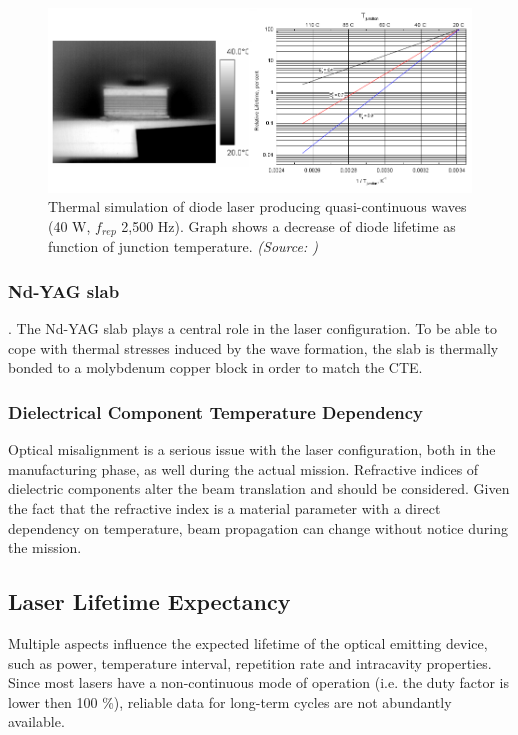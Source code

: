\begin{figure}[ht!]
\centering
\includegraphics[scale=0.5]{chapters/img/diode_thermal.png} 
\caption{Thermal simulation of diode laser producing quasi-continuous waves (40 W, $f_{rep}$ 2,500 Hz). Graph shows a decrease of diode lifetime as function of junction temperature. \emph{(Source: \cite{thermaldiode})}}
\label{thermal_control}
\end{figure}

\subsubsection{\acs{Nd-YAG} slab}. 
The \acs{Nd-YAG} slab plays a central role in the \acs{laser} configuration. To be able to cope with thermal stresses induced by the wave formation, the slab is thermally bonded to a molybdenum copper block in order to match the CTE.

\subsubsection{Dielectrical Component Temperature Dependency}
Optical misalignment is a serious issue  with the \acs{laser} configuration, both in the manufacturing phase, as well during the actual mission. Refractive indices of dielectric components alter the beam translation and should be considered. Given the fact that the refractive index is a material parameter with a direct dependency on temperature, beam propagation can change without notice during the mission. 

\subsection{Laser Lifetime Expectancy} 
\label{opticallifetime}
Multiple aspects influence the expected lifetime of the optical emitting device, such as power, temperature interval, repetition rate and intracavity properties. Since most \acp{laser} have a non-continuous mode of operation (i.e. the duty factor is lower then 100 \%), reliable data for long-term cycles are not abundantly available.  

